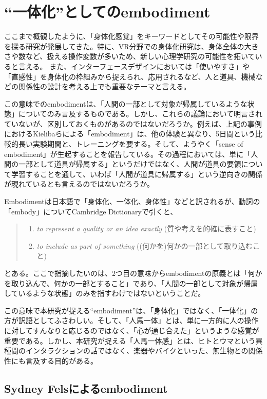 \section{``一体化''としてのembodiment}
ここまで概観したように、「身体化感覚」をキーワードとしてその可能性や限界を探る研究が発展してきた。特に、VR分野での身体化研究は、身体全体の大きさや数など、扱える操作変数が多いため、新しい心理学研究の可能性を拓いていると言える。
また、インターフェースデザインにおいては「使いやすさ」や「直感性」を身体化の枠組みから捉えられ、応用されるなど、人と道具、機械などの関係性の設計を考える上でも重要なテーマと言える。

この意味でのembodimentは、「人間の一部として対象が帰属しているような状態」についてのみ言及するものである。しかし、これらの議論において明言されていないが、区別しておくものがあるのではないだろうか。例えば、上記の事例におけるKielibaらによる「embodiment」は、他の体験と異なり、5日間という比較的長い実験期間と、トレーニングを要する。そして、ようやく「sense of embodiment」が生起することを報告している。その過程においては、単に「人間の一部として道具が帰属する」というだけではなく、人間が道具の要領について学習することを通して、いわば「人間が道具に帰属する」という逆向きの関係が現れているとも言えるのではないだろうか。

Embodimentは日本語で「身体化、一体化、身体性」などと訳されるが、動詞の「embody」についてCambridge Dictionaryで引くと、
\begin{quote}
  \begin{enumerate}
    \item \textit{to represent a quality or an idea exactly} (質や考えを的確に表すこと) 
    \item \textit{to include as part of something} ((何かを)何かの一部として取り込むこと)
  \end{enumerate}
\end{quote}
とある\cite{embody}。ここで指摘したいのは、2つ目の意味からembodimentの原義とは「何かを取り込んで、何かの一部とすること」であり、「人間の一部として対象が帰属しているような状態」のみを指すわけではないということだ。

この意味で本研究が捉える``embodiment''は、「身体化」ではなく、「一体化」の方が訳語としてふさわしい。そして、「人馬一体」とは、単に一方的に人の操作に対してすんなりと応じるのではなく、「心が通じ合えた」というような感覚が重要である。しかし、本研究が捉える「人馬一体感」とは、ヒトとウマという異種間のインタラクションの話ではなく、楽器やバイクといった、無生物との関係性にも言及する目的がある。

\subsection{Sydney Felsによるembodiment}

